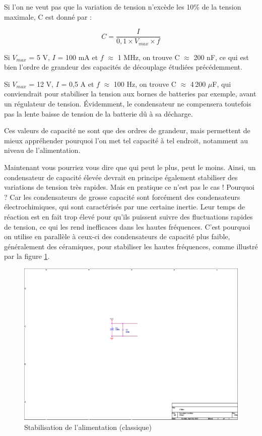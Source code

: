 \documentclass[a4paper]{article}
\begin{document}
Si l'on ne veut pas que la variation de tension n'excède les 10\% de la tension maximale, C est donné par :

\[C = \frac{I}{0,1 \times V_{max} \times f}\]

Si $V_{max}$ = 5 V, $I$ = 100 mA et $f$ $\approx$ 1 MHz, on trouve C $\approx$ 200 nF, ce qui est bien l'ordre de grandeur des capacités de découplage étudiées précédemment.

Si $V_{max}$ = 12 V, $I$ = 0,5 A et $f$ $\approx$ 100 Hz, on trouve C $\approx$ 4\,200 $\mu$F, qui conviendrait pour stabiliser la tension aux bornes de batteries par exemple, avant un régulateur de tension. Évidemment, le condensateur ne compensera toutefois pas la lente baisse de tension de la batterie dû à sa décharge.

Ces valeurs de capacité ne sont que des ordres de grandeur, mais permettent de mieux appréhender pourquoi l'on met tel capacité à tel endroit, notamment au niveau de l'alimentation.

Maintenant vous pourriez vous dire que qui peut le plus, peut le moins. Ainsi, un condensateur de capacité élevée devrait en principe également stabiliser des variations de tension très rapides. Mais en pratique ce n'est pas le cas ! Pourquoi ? Car les condensateurs de grosse capacité sont forcément des condensateurs électrochimiques, qui sont caractérisés par une certaine inertie. Leur temps de réaction est en fait trop élevé pour qu'ils puissent suivre des fluctuations rapides de tension, ce qui les rend inefficaces dans les hautes fréquences. C'est pourquoi on utilise en parallèle à ceux-ci des condensateurs de capacité plus faible, généralement des céramiques, pour stabiliser les hautes fréquences, comme illustré par la figure \ref{Condensateurs_stabilisation}.

\begin{figure}[H]
	\centering
	\includegraphics[scale=1.00]{Images/Condensateurs_stabilisation}
	\caption{Stabilisation de l'alimentation (classique)
		\label{Condensateurs_stabilisation}}
\end{figure}
\end{document}
